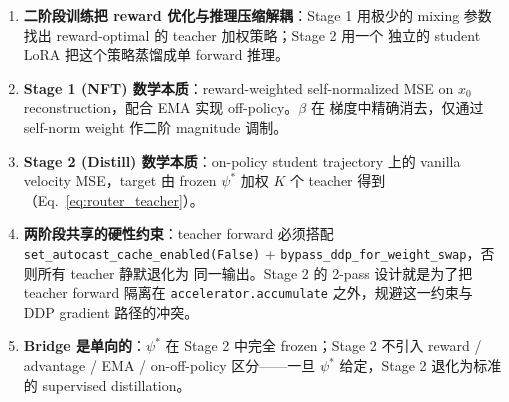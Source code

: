 \documentclass[11pt,a4paper]{article}
\theoremstyle{definition}
\begin{document}
\begin{tcolorbox}[colback=yellow!5,colframe=yellow!60!black,title=\textbf{核心结论}]
\begin{enumerate}[leftmargin=1.5em]
\item \textbf{二阶段训练把 reward 优化与推理压缩解耦}：Stage 1 用极少的
  mixing 参数找出 reward-optimal 的 teacher 加权策略；Stage 2 用一个
  独立的 student LoRA 把这个策略蒸馏成单 forward 推理。
\item \textbf{Stage 1 (NFT) 数学本质}：reward-weighted self-normalized
  MSE on $x_0$ reconstruction，配合 EMA 实现 off-policy。$\beta$ 在
  梯度中精确消去，仅通过 self-norm weight 作二阶 magnitude 调制。
\item \textbf{Stage 2 (Distill) 数学本质}：on-policy student trajectory 上的
  vanilla velocity MSE，target 由 frozen $\psi^*$ 加权 $K$ 个 teacher
  得到（Eq.~\eqref{eq:router_teacher}）。
\item \textbf{两阶段共享的硬性约束}：teacher forward 必须搭配
  \texttt{set\_autocast\_cache\_enabled(False)} +
  \texttt{bypass\_ddp\_for\_weight\_swap}，否则所有 teacher 静默退化为
  同一输出。Stage 2 的 2-pass 设计就是为了把 teacher forward 隔离在
  \texttt{accelerator.accumulate} 之外，规避这一约束与 DDP gradient
  路径的冲突。
\item \textbf{Bridge 是单向的}：$\psi^*$ 在 Stage 2 中完全 frozen；Stage
  2 不引入 reward / advantage / EMA / on-off-policy 区分——一旦
  $\psi^*$ 给定，Stage 2 退化为标准的 supervised distillation。
\end{enumerate}
\end{tcolorbox}
\end{document}
